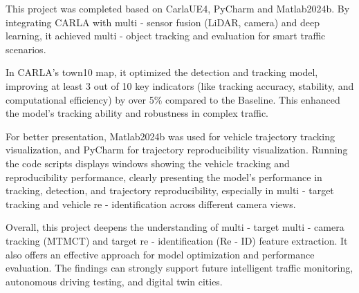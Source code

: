 \begin{abstracten}

This project was completed based on CarlaUE4, PyCharm and Matlab2024b. By integrating CARLA with multi - sensor fusion (LiDAR, camera) and deep learning, it achieved multi - object tracking and evaluation for smart traffic scenarios. 

In CARLA's town10 map, it optimized the detection and tracking model, improving at least 3 out of 10 key indicators (like tracking accuracy, stability, and computational efficiency) by over 5\% compared to the Baseline. This enhanced the model's tracking ability and robustness in complex traffic.

For better presentation, Matlab2024b was used for vehicle trajectory tracking visualization, and PyCharm for trajectory reproducibility visualization. Running the code scripts displays windows showing the vehicle tracking and reproducibility performance, clearly presenting the model's performance in tracking, detection, and trajectory reproducibility, especially in multi - target tracking and vehicle re - identification across different camera views.

Overall, this project deepens the understanding of multi - target multi - camera tracking (MTMCT) and target re - identification (Re - ID) feature extraction. It also offers an effective approach for model optimization and performance evaluation. The findings can strongly support future intelligent traffic monitoring, autonomous driving testing, and digital twin cities.



\end{abstracten}
